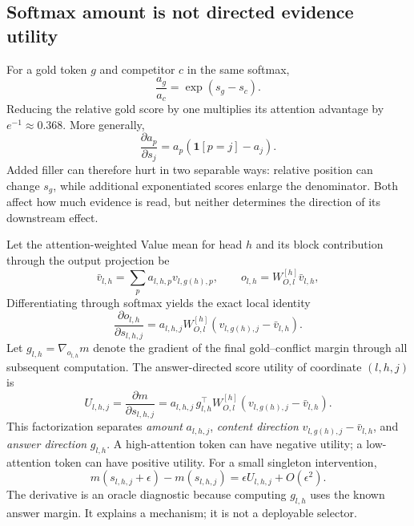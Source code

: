 \subsection{Softmax amount is not directed evidence utility}

For a gold token $g$ and competitor $c$ in the same softmax,
\begin{equation}
  \frac{a_g}{a_c}=\exp(s_g-s_c).
  \label{eq:attention-ratio}
\end{equation}
Reducing the relative gold score by one multiplies its attention advantage by
$e^{-1}\approx0.368$.  More generally,
\begin{equation}
  \frac{\partial a_p}{\partial s_j}
  =a_p(\mathbf 1[p=j]-a_j).
  \label{eq:softmax-jacobian}
\end{equation}
Added filler can therefore hurt in two separable ways: relative position can
change $s_g$, while additional exponentiated scores enlarge the denominator.
Both affect how much evidence is read, but neither determines the direction of
its downstream effect.

Let the attention-weighted Value mean for head $h$ and its block contribution
through the output projection be
\begin{equation}
  \bar v_{l,h}=\sum_p a_{l,h,p}v_{l,g(h),p},
  \qquad
  o_{l,h}=W_{O,l}^{[h]}\bar v_{l,h},
  \label{eq:value-mean}
\end{equation}
Differentiating through softmax yields the exact local identity
\begin{equation}
  \frac{\partial o_{l,h}}{\partial s_{l,h,j}}
  =a_{l,h,j}W_{O,l}^{[h]}(v_{l,g(h),j}-\bar v_{l,h}).
  \label{eq:centered-value-derivative}
\end{equation}
Let $g_{l,h}=\nabla_{o_{l,h}}m$ denote the gradient of the final gold--conflict
margin through all subsequent computation.  The answer-directed score utility of
coordinate $(l,h,j)$ is
\begin{equation}
  U_{l,h,j}
  =\frac{\partial m}{\partial s_{l,h,j}}
  =a_{l,h,j}\,g_{l,h}^\top W_{O,l}^{[h]}
  (v_{l,g(h),j}-\bar v_{l,h}).
  \label{eq:directed-utility}
\end{equation}
This factorization separates \emph{amount} $a_{l,h,j}$, \emph{content direction}
$v_{l,g(h),j}-\bar v_{l,h}$, and \emph{answer direction} $g_{l,h}$.  A high-attention token
can have negative utility; a low-attention token can have positive utility.
For a small singleton intervention,
\begin{equation}
  m(s_{l,h,j}+\epsilon)-m(s_{l,h,j})
  =\epsilon U_{l,h,j}+O(\epsilon^2).
  \label{eq:first-order-margin}
\end{equation}
The derivative is an oracle diagnostic because computing $g_{l,h}$ uses the known
answer margin.  It explains a mechanism; it is not a deployable selector.

